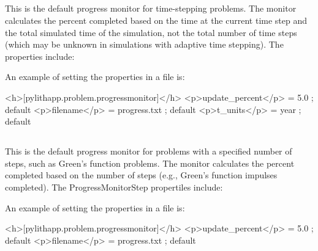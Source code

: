 \subsection{}

This is the default progress monitor for time-stepping problems. The
monitor calculates the percent completed based on the time at the
current time step and the total simulated time of the simulation,
not the total number of time steps (which may be unknown in simulations
with adaptive time stepping). The  properties
include:
\begin{inventory}
\end{inventory}
An example of setting the properties in a  file is:
\begin{cfg}
<h>[pylithapp.problem.progressmonitor]</h>
<p>update_percent</p> = 5.0 ; default
<p>filename</p> = progress.txt ; default
<p>t_units</p> = year ; default
\end{cfg}

\subsection{}

This is the default progress monitor for problems with a specified
number of steps, such as Green's function problems. The monitor calculates
the percent completed based on the number of steps (e.g., Green's
function impulses completed). The ProgressMonitorStep propertiles
include:
\begin{inventory}
\end{inventory}
An example of setting the properties in a  file is:
\begin{cfg}
<h>[pylithapp.problem.progressmonitor]</h>
<p>update_percent</p> = 5.0 ; default
<p>filename</p> = progress.txt ; default
\end{cfg}

